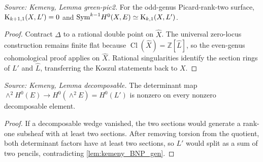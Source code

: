 \begin{lemma}
  \label{lem:kemeny_green_pic2}
  \textit{Source: Kemeny, Lemma green-pic2.}
  For the odd-genus Picard-rank-two surface,
  \(\mathrm{K}_{k+1,1}(X,L')=0\) and
  \(\mathrm{Sym}^{k-1}H^0(X,E)\simeq \mathrm{K}_{k,1}(X,L')\).
\end{lemma}
\begin{proof}
  Contract \(\Delta\) to a rational double point on \(\hat X\).  The universal
  zero-locus construction remains finite flat because \(\operatorname{Cl}(\hat
  X)=\mathbb Z[\hat L]\), so the even-genus cohomological proof applies on
  \(\hat X\).  Rational singularities identify the section rings of \(L'\) and
  \(\hat L\), transferring the Koszul statements back to \(X\).
\end{proof}

\begin{lemma}
  \label{lem:kemeny_decomposable}
  \textit{Source: Kemeny, Lemma decomposable.}
  The determinant map
  \(\wedge^2H^0(E)\to H^0(\wedge^2E)=H^0(L')\) is nonzero on every nonzero
  decomposable element.
\end{lemma}
\begin{proof}
  If a decomposable wedge vanished, the two sections would generate a rank-one
  subsheaf with at least two sections.  After removing torsion from the quotient,
  both determinant factors have at least two sections, so \(L'\) would split as a
  sum of two pencils, contradicting \cref{lem:kemeny_BNP_gen}.
\end{proof}

